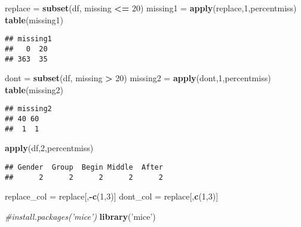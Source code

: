 \documentclass[
]{article}
\newenvironment{Shaded}{\begin{snugshade}}{\end{snugshade}}
\newcommand{\CommentTok}[1]{\textcolor[rgb]{0.56,0.35,0.01}{\textit{#1}}}
\newcommand{\DecValTok}[1]{\textcolor[rgb]{0.00,0.00,0.81}{#1}}
\newcommand{\KeywordTok}[1]{\textcolor[rgb]{0.13,0.29,0.53}{\textbf{#1}}}
\newcommand{\NormalTok}[1]{#1}
\newcommand{\OperatorTok}[1]{\textcolor[rgb]{0.81,0.36,0.00}{\textbf{#1}}}
\newcommand{\StringTok}[1]{\textcolor[rgb]{0.31,0.60,0.02}{#1}}
\begin{document}
\begin{Shaded}
\begin{Highlighting}[]
\NormalTok{replace =}\StringTok{ }\KeywordTok{subset}\NormalTok{(df, missing }\OperatorTok{<=}\StringTok{ }\DecValTok{20}\NormalTok{)}
\NormalTok{missing1 =}\StringTok{ }\KeywordTok{apply}\NormalTok{(replace,}\DecValTok{1}\NormalTok{,percentmiss)}
\KeywordTok{table}\NormalTok{(missing1)}
\end{Highlighting}
\end{Shaded}

\begin{verbatim}
## missing1
##   0  20 
## 363  35
\end{verbatim}

\begin{Shaded}
\begin{Highlighting}[]
\NormalTok{dont =}\StringTok{ }\KeywordTok{subset}\NormalTok{(df, missing }\OperatorTok{>}\StringTok{ }\DecValTok{20}\NormalTok{)}
\NormalTok{missing2 =}\StringTok{ }\KeywordTok{apply}\NormalTok{(dont,}\DecValTok{1}\NormalTok{,percentmiss)}
\KeywordTok{table}\NormalTok{(missing2)}
\end{Highlighting}
\end{Shaded}

\begin{verbatim}
## missing2
## 40 60 
##  1  1
\end{verbatim}

\begin{Shaded}
\begin{Highlighting}[]
\KeywordTok{apply}\NormalTok{(df,}\DecValTok{2}\NormalTok{,percentmiss)}
\end{Highlighting}
\end{Shaded}

\begin{verbatim}
## Gender  Group  Begin Middle  After 
##      2      2      2      2      2
\end{verbatim}

\begin{Shaded}
\begin{Highlighting}[]
\NormalTok{replace_col =}\StringTok{ }\NormalTok{replace[,}\OperatorTok{-}\KeywordTok{c}\NormalTok{(}\DecValTok{1}\NormalTok{,}\DecValTok{3}\NormalTok{)]}
\NormalTok{dont_col =}\StringTok{ }\NormalTok{replace[,}\KeywordTok{c}\NormalTok{(}\DecValTok{1}\NormalTok{,}\DecValTok{3}\NormalTok{)]}

\CommentTok{#install.packages('mice')}
\KeywordTok{library}\NormalTok{(}\StringTok{'mice'}\NormalTok{)}
\end{Highlighting}
\end{Shaded}
\end{document}
